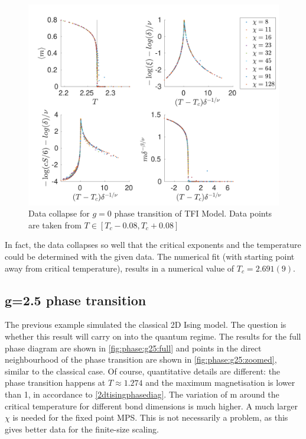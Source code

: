 \begin{figure}[!htbp]
    \center
    \includegraphics[width=\textwidth]{Figuren/phasediag/g0/zoomed.pdf}
    \caption{ Data collapse for $g=0$ phase transition of \Gls{TFI} Model. Data points are taken from $T \in \left[ T_c -0.08, T_c +0.08 \right]$ }
    \label{fig:phase:g0:zoomed}
\end{figure}
In fact, the data collapses so well that the critical exponents and the temperature could be determined with the given data. The numerical fit (with starting point away from  critical temperature), results in a numerical value of $T_c = 2.691(9) $.

\subsection{g=2.5 phase transition}

The previous example simulated the classical 2D Ising model. The question is whether this result will carry on into the quantum regime. The results for the full phase diagram are shown in \cref{fig:phase:g25:full} and points in the direct neighbourhood of the phase transition are shown in \cref{fig:phase:g25:zoomed}, similar to the classical case. Of course, quantitative details are different: the phase transition happens at $T\approx 1.274$ and the maximum magnetisation is lower than 1, in accordance to \cref{2dtisingphasediag}. The variation of m around the critical temperature for different bond dimensions is much higher. A much larger $\chi$ is needed for the fixed point \Gls{MPS}. This is not necessarily a problem, as this gives better data for the finite-size scaling.

